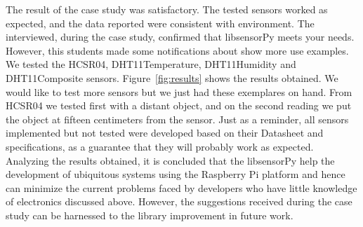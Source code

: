 \documentclass{acm_proc_article-sp}
\begin{document}
The result of the case study was satisfactory. The tested sensors worked as expected, and the data reported were consistent with environment. The interviewed, during the case study, confirmed that libsensorPy meets your needs. However, this students made some notifications about show more use examples.
\newline
\newline
We tested the HCSR04, DHT11Temperature, DHT11Humidity and DHT11Composite sensors. Figure~\ref{fig:results} shows the results obtained. We would like to test more sensors but we just had these exemplares on hand. From HCSR04 we tested first with a distant object, and on the second reading we put the object at fifteen centimeters from the sensor. Just as a reminder, all sensors implemented but not tested were developed based on their Datasheet and specifications, as a guarantee that they will probably work as expected.
\newline
\newline
Analyzing the results obtained, it is concluded that the libsensorPy help the development of ubiquitous systems using the Raspberry Pi platform and hence can minimize the current problems faced by developers who have little knowledge of electronics discussed above. However, the suggestions received during the case study can be harnessed to the library improvement in future work.
\end{document}
